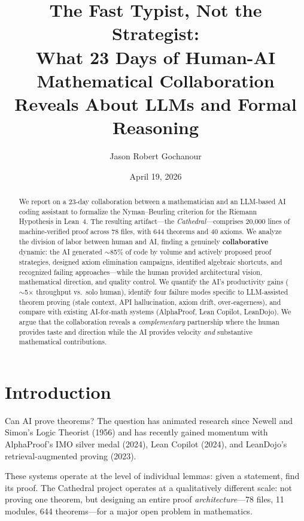 \documentclass[11pt,a4paper]{article}
\title{%
  The Fast Typist, Not the Strategist:\\
  What 23 Days of Human-AI Mathematical Collaboration\\
  Reveals About LLMs and Formal Reasoning%
}
\author{
  Jason Robert Gochanour
}
\date{April 19, 2026}
\begin{document}
\maketitle

\begin{abstract}
We report on a 23-day collaboration between a mathematician and an
LLM-based AI coding assistant to formalize the Nyman--Beurling
criterion for the Riemann Hypothesis in Lean~4. The resulting
artifact---the \emph{Cathedral}---comprises 20,000 lines of
machine-verified proof across 78 files, with 644 theorems and 40
axioms. We analyze the division of labor between human and AI,
finding a genuinely \textbf{collaborative} dynamic: the AI
generated $\sim$85\% of code by volume and actively proposed
proof strategies, designed axiom elimination campaigns, identified
algebraic shortcuts, and recognized failing approaches---while the
human provided architectural vision, mathematical direction, and
quality control. We quantify the AI's productivity gains
($\sim$5$\times$ throughput vs.\ solo human), identify four failure
modes specific to LLM-assisted theorem proving (stale context, API
hallucination, axiom drift, over-eagerness), and compare with
existing AI-for-math systems (AlphaProof, Lean Copilot, LeanDojo).
We argue that the collaboration reveals a \emph{complementary}
partnership where the human provides taste and direction while the
AI provides velocity \emph{and} substantive mathematical
contributions.
\end{abstract}

\tableofcontents

\section{Introduction}

Can AI prove theorems? The question has animated research since
Newell and Simon's Logic Theorist (1956) and has recently gained
momentum with AlphaProof's IMO silver medal (2024), Lean Copilot
(2024), and LeanDojo's retrieval-augmented proving (2023).

These systems operate at the level of individual lemmas: given a
statement, find its proof. The Cathedral project operates at a
qualitatively different scale: not proving one theorem, but designing
an entire proof \emph{architecture}---78 files, 11 modules, 644
theorems---for a major open problem in mathematics.
\end{document}
